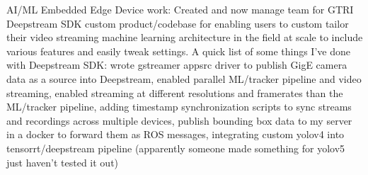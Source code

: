 

AI/ML Embedded Edge Device work: Created and now manage team for GTRI Deepstream SDK custom product/codebase for enabling
users to custom tailor their video streaming machine learning architecture in the field at scale to include various features and easily
tweak settings. A quick list of some things I’ve done with Deepstream SDK: wrote gstreamer appsrc driver to publish GigE camera data
as a source into Deepstream, enabled parallel ML/tracker pipeline and video streaming, enabled streaming at different resolutions and
framerates than the ML/tracker pipeline, adding timestamp synchronization scripts to sync streams and recordings across multiple
devices, publish bounding box data to my server in a docker to forward them as ROS messages, integrating custom yolov4 into
tensorrt/deepstream pipeline (apparently someone made something for yolov5 just haven’t tested it out)
